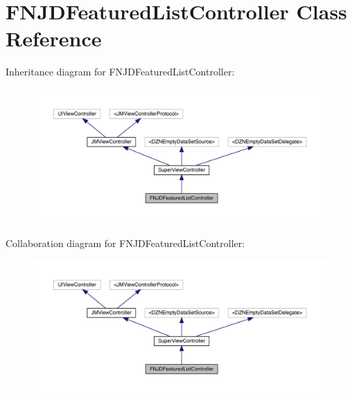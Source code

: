 \hypertarget{interface_f_n_j_d_featured_list_controller}{}\section{F\+N\+J\+D\+Featured\+List\+Controller Class Reference}
\label{interface_f_n_j_d_featured_list_controller}


Inheritance diagram for F\+N\+J\+D\+Featured\+List\+Controller\+:\nopagebreak
\begin{figure}[H]
\begin{center}
\leavevmode
\includegraphics[width=350pt]{interface_f_n_j_d_featured_list_controller__inherit__graph}
\end{center}
\end{figure}


Collaboration diagram for F\+N\+J\+D\+Featured\+List\+Controller\+:\nopagebreak
\begin{figure}[H]
\begin{center}
\leavevmode
\includegraphics[width=350pt]{interface_f_n_j_d_featured_list_controller__coll__graph}
\end{center}
\end{figure}
